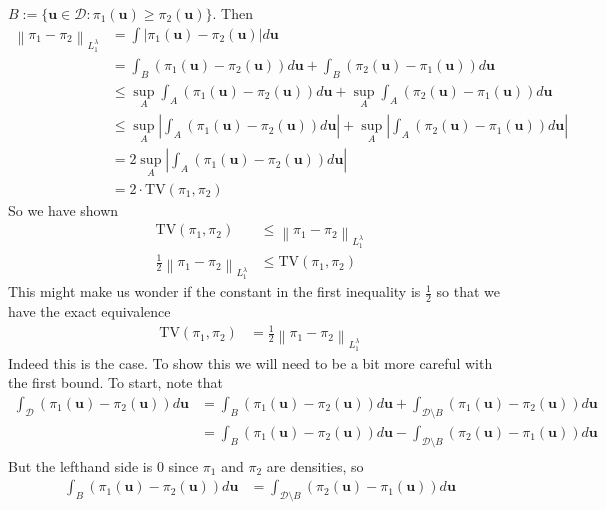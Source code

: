 \documentclass[12pt]{article}
\newcommand{\bpar}{\mathbf{u}} %
\newcommand*{\norm}[1]{\left\lVert#1\right\rVert}
\newcommand*{\abs}[1]{\left\lvert#1\right\rvert}
\begin{document}
$B := \{\bpar \in \mathcal{D}: \pi_1(\bpar) \geq \pi_2(\bpar)\}$. Then 
\begin{align*}
\norm{\pi_1 - \pi_2}_{L_1^\lambda} &= \int \abs{\pi_1(\bpar) - \pi_2(\bpar)} d\bpar \\
						      &= \int_B \left(\pi_1(\bpar) - \pi_2(\bpar)\right) d\bpar +  \int_B \left(\pi_2(\bpar)  - \pi_1(\bpar)\right) d\bpar \\
						      &\leq \sup_A \int_A \left(\pi_1(\bpar) - \pi_2(\bpar)\right) d\bpar + \sup_A \int_A \left(\pi_2(\bpar)  - \pi_1(\bpar)\right) d\bpar \\
						      &\leq \sup_A \abs{\int_A \left(\pi_1(\bpar) - \pi_2(\bpar)\right) d\bpar} + \sup_A \abs{\int_A \left(\pi_2(\bpar)  - \pi_1(\bpar)\right) d\bpar} \\
						      &= 2 \sup_A \abs{\int_A \left(\pi_1(\bpar) - \pi_2(\bpar)\right) d\bpar} \\
						      &= 2 \cdot \text{TV}(\pi_1, \pi_2)
\end{align*}
So we have shown 
\begin{align*}
\text{TV}(\pi_1, \pi_2) &\leq \norm{\pi_1 - \pi_2}_{L_1^\lambda} \\
\frac{1}{2} \norm{\pi_1 - \pi_2}_{L_1^\lambda} &\leq \text{TV}(\pi_1, \pi_2)
\end{align*}
This might make us wonder if the constant in the first inequality is $\frac{1}{2}$ so that we have the exact equivalence 
\begin{align*}
\text{TV}(\pi_1, \pi_2) &= \frac{1}{2} \norm{\pi_1 - \pi_2}_{L_1^\lambda}
\end{align*}
Indeed this is the case. To show this we will need to be a bit more careful with the first bound. To start, note that 
\begin{align*}
\int_\mathcal{D} \left(\pi_1(\bpar) - \pi_2(\bpar)\right) d\bpar &= \int_B \left(\pi_1(\bpar) - \pi_2(\bpar)\right) d\bpar + \int_{\mathcal{D} \setminus B} \left(\pi_1(\bpar) - \pi_2(\bpar)\right) d\bpar \\
											     &=  \int_B \left(\pi_1(\bpar) - \pi_2(\bpar)\right) d\bpar - \int_{\mathcal{D} \setminus B} \left(\pi_2(\bpar) - \pi_1(\bpar)\right) d\bpar \\
\end{align*}
But the lefthand side is $0$ since $\pi_1$ and $\pi_2$ are densities, so 
\begin{align*}
\int_B \left(\pi_1(\bpar) - \pi_2(\bpar)\right) d\bpar &= \int_{\mathcal{D} \setminus B} \left(\pi_2(\bpar) - \pi_1(\bpar)\right) d\bpar
\end{align*}
\end{document}
